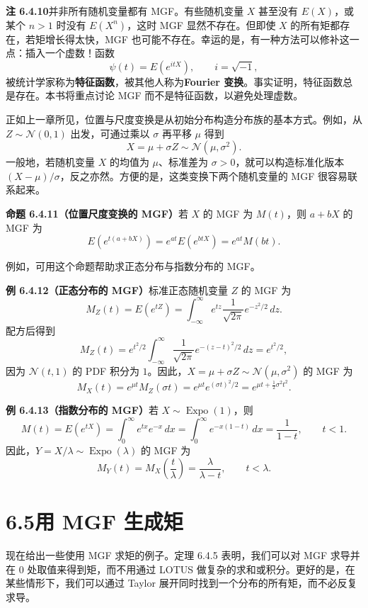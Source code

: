 \documentclass[UTF8,12pt,a4paper,fontset=fandol]{ctexart}
\begin{document}
\noindent\textbf{注 6.4.10}\quad 并非所有随机变量都有 MGF。有些随机变量 $X$ 甚至没有 $E(X)$，或某个 $n>1$ 时没有 $E(X^n)$，这时 MGF 显然不存在。但即使 $X$ 的所有矩都存在，若矩增长得太快，MGF 也可能不存在。幸运的是，有一种方法可以修补这一点：插入一个虚数！函数
\[
  \psi(t)=E(e^{itX}),\qquad i=\sqrt{-1},
\]
被统计学家称为\textbf{特征函数}，被其他人称为\textbf{Fourier 变换}。事实证明，特征函数总是存在。本书将重点讨论 MGF 而不是特征函数，以避免处理虚数。

正如上一章所见，位置与尺度变换是从初始分布构造分布族的基本方式。例如，从 $Z\sim\mathcal{N}(0,1)$ 出发，可通过乘以 $\sigma$ 再平移 $\mu$ 得到
\[
  X=\mu+\sigma Z\sim\mathcal{N}(\mu,\sigma^2).
\]
一般地，若随机变量 $X$ 的均值为 $\mu$、标准差为 $\sigma>0$，就可以构造标准化版本 $(X-\mu)/\sigma$，反之亦然。方便的是，这类变换下两个随机变量的 MGF 很容易联系起来。

\noindent\textbf{命题 6.4.11（位置尺度变换的 MGF）}\quad 若 $X$ 的 MGF 为 $M(t)$，则 $a+bX$ 的 MGF 为
\[
  E(e^{t(a+bX)})=e^{at}E(e^{btX})=e^{at}M(bt).
\]

例如，可用这个命题帮助求正态分布与指数分布的 MGF。

\noindent\textbf{例 6.4.12（正态分布的 MGF）}\quad 标准正态随机变量 $Z$ 的 MGF 为
\[
  M_Z(t)=E(e^{tZ})
  =
  \int_{-\infty}^{\infty}
  e^{tz}\frac1{\sqrt{2\pi}}e^{-z^2/2}\,dz.
\]
配方后得到
\[
  M_Z(t)
  =
  e^{t^2/2}
  \int_{-\infty}^{\infty}
  \frac1{\sqrt{2\pi}}e^{-(z-t)^2/2}\,dz
  =
  e^{t^2/2},
\]
因为 $\mathcal{N}(t,1)$ 的 PDF 积分为 $1$。因此，$X=\mu+\sigma Z\sim\mathcal{N}(\mu,\sigma^2)$ 的 MGF 为
\[
  M_X(t)
  =
  e^{\mu t}M_Z(\sigma t)
  =
  e^{\mu t}e^{(\sigma t)^2/2}
  =
  e^{\mu t+\frac12\sigma^2t^2}.
\]

\noindent\textbf{例 6.4.13（指数分布的 MGF）}\quad 若 $X\sim\operatorname{Expo}(1)$，则
\[
  M(t)=E(e^{tX})
  =
  \int_0^{\infty}e^{tx}e^{-x}\,dx
  =
  \int_0^{\infty}e^{-x(1-t)}\,dx
  =
  \frac1{1-t},\qquad t<1.
\]
因此，$Y=X/\lambda\sim\operatorname{Expo}(\lambda)$ 的 MGF 为
\[
  M_Y(t)=M_X\left(\frac{t}{\lambda}\right)
  =
  \frac{\lambda}{\lambda-t},\qquad t<\lambda.
\]

\section*{6.5\quad 用 MGF 生成矩}

现在给出一些使用 MGF 求矩的例子。定理 6.4.5 表明，我们可以对 MGF 求导并在 $0$ 处取值来得到矩，而不用通过 LOTUS 做复杂的求和或积分。更好的是，在某些情形下，我们可以通过 Taylor 展开同时找到一个分布的所有矩，而不必反复求导。
\end{document}

